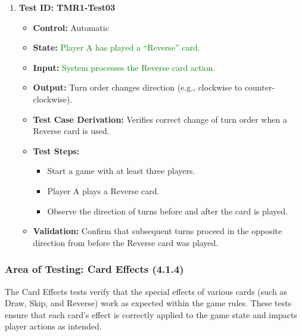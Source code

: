 \documentclass[12pt]{article}
\newcommand{\added}[1]{\textcolor{green}{#1}}
\begin{document}
\begin{enumerate}
    \item \textbf{Test ID: TMR1-Test03}
    \begin{itemize}
        \item \textbf{Control:} Automatic
        \item \textbf{State:} \added{Player A has played a “Reverse” card.}
        \item \textbf{Input:} \added{System processes the Reverse card action.}
        \item \textbf{Output:} Turn order changes direction (e.g., clockwise to counter-clockwise).
        \item \textbf{Test Case Derivation:} Verifies correct change of turn order when a Reverse card is used.
        \item \textbf{Test Steps:}
        \begin{itemize}
            \item Start a game with at least three players.
            \item Player A plays a Reverse card.
            \item Observe the direction of turns before and after the card is played.
        \end{itemize}
        \item \textbf{Validation:} Confirm that subsequent turns proceed in the opposite direction from before the Reverse card was played.
    \end{itemize}
\end{enumerate}

\subsubsection{Area of Testing: Card Effects (4.1.4)}

The Card Effects tests verify that the special effects of various cards (such as Draw, Skip, and Reverse) work as expected within the game rules. These tests ensure that each card’s effect is correctly applied to the game state and impacts player actions as intended.
\end{document}
